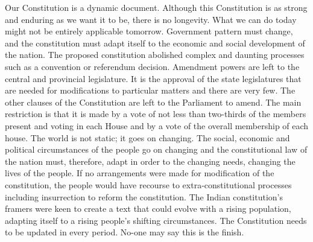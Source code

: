 \setcounter{figure}{0}
\setcounter{table}{0}

\label{2018-art1}

\begin{multicols}{2}


\vspace{-.15cm}

\noi
Our Constitution is a dynamic document. Although this Constitution is as strong and enduring
as we want it to be, there is no longevity. What we can do today might not be entirely
applicable tomorrow. Government pattern must change, and the constitution must adapt itself
to the economic and social development of the nation. The proposed constitution abolished
complex and daunting processes such as a convention or referendum decision. Amendment
powers are left to the central and provincial legislature. It is the approval of the state
legislatures that are needed for modifications to particular matters and there are very few. The
other clauses of the Constitution are left to the Parliament to amend. The main restriction is
that it is made by a vote of not less than two-thirds of the members present and voting in each
House and by a vote of the overall membership of each house. The world is not static; it goes
on changing. The social, economic and political circumstances of the people go on changing
and the constitutional law of the nation must, therefore, adapt in order to the changing needs,
changing the lives of the people. If no arrangements were made for modification of the
constitution, the people would have recourse to extra-constitutional processes including
insurrection to reform the constitution. The Indian constitution’s framers were keen to create
a text that could evolve with a rising population, adapting itself to a rising people’s shifting
circumstances. The Constitution needs to be updated in every period. No-one may say this is
the finish.

\vspace{-.15cm}


\vspace{-.15cm}


\end{multicols}
